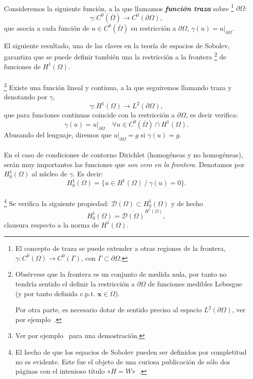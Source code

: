 \documentclass[11pt]{article}
\theoremstyle{plain}
\theoremstyle{definition}
\newcounter{stepnum}[section]
\newcommand{\step}[1][]{\bigskip\noindent\textbf{\thesection.\refstepcounter{stepnum}\thestepnum}.\enspace{#1}}
\renewcommand{\step}[1][]{\paragraph{#1}\hspace{-1.1em}}
\newcommand{\deff}[1]{\textit{\textbf{#1}}}
\newcommand{\xx}{\ensuremath{\mathbf{x}}\xspace}
\newcommand{\TestSpace}{\ensuremath{\mathcal{D}}}
\begin{document}
\step 
Consideremos la siguiente función, a la que llamamos \deff{función traza} sobre%
\footnote{El concepto de traza se puede extender a otras regiones de la frontera, $\gamma:C^0(\Omega) \to C^0(\Gamma)$, con $\Gamma\subset\partial\Omega$.}
%
$\partial\Omega$:
\[
  \gamma:C^0(\overline\Omega) \to C^0(\partial\Omega),
\]
que asocia a cada función de $u\in C^0(\overline\Omega)$ su restricción a $\partial\Omega$, $\gamma(u)=u|_{\partial\Omega}$.

El siguiente resultado, una de las claves en la teoría de espacios de Sobolev, garantiza que se puede definir también una la restricción a la frontera%
%
\footnote{Obsérvese que la frontera es un conjunto de medida nula, por tanto no tendría sentido el definir la restricción a $\partial\Omega$ de funciones medibles Lebesgue (y por tanto definida c.p.t. $\xx\in\Omega$).\par 
Por otra parte, es necesario dotar de sentido preciso al espacio $L^2(\partial\Omega)$, ver por ejemplo~\cite{sayas2019variational}.}
de funciones de $H^1(\Omega)$. 

\step{\textbf{Teorema.}}\footnote{Ver por ejemplo~\cite{sayas2019variational} para una demostración.} 
\label{paragraph.teorema.traza}
Existe una función lineal y continua, a la que seguiremos llamando traza y denotando por $\gamma$,
\[
  \gamma:  H^1(\Omega) \to L^2(\partial\Omega),
\]
que para funciones continuas coincide con la restricción a $\partial\Omega$, es decir verifica:
\[
  \gamma(u) = u|_{\partial\Omega} \quad  \forall u\in C^0(\overline\Omega)\cap H^1(\Omega).
\]
Abusando del lenguaje, diremos que $u|_{\partial\Omega}=g$ si $\gamma(u)=g$.

\step
En el caso de condiciones de contorno Dirichlet (homogéneas y no homogéneas), serán muy importantes las funciones que \textit{son cero en la frontera}. Denotamos por $H_0^1(\Omega)$ al núcleo de $\gamma$. Es decir:
\[
  H_0^1(\Omega) = \{ u\in H^1(\Omega) \ /\ \gamma(u)=0\}.
\]

\step{\textbf{Teorema.}}%
\footnote{El hecho de que los espacios de Sobolev pueden ser definidos por completitud no es evidente. Este fue el objeto de una curiosa publicación de sólo dos páginas con el intenioso título «$H=W$»~\cite{meyers1964h}.}
Se verifica la siguiente propiedad: $\TestSpace(\Omega)\subset H_0^1(\Omega)$ y de hecho%
$$H_0^1(\Omega) = \overline{\TestSpace(\Omega)}^{H^1(\Omega)},$$ clausura respecto a la norma de $H^1(\Omega)$.
\end{document}
